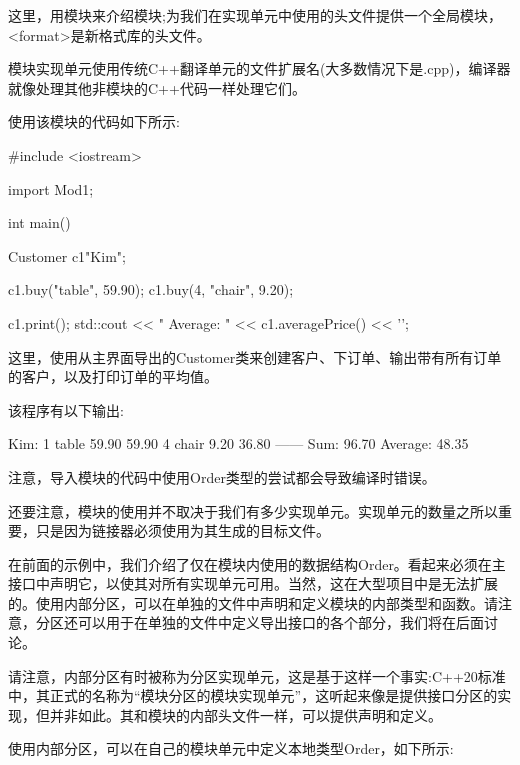 这里，用模块来介绍模块;为我们在实现单元中使用的头文件提供一个全局模块，<format>是新格式库的头文件。

模块实现单元使用传统C++翻译单元的文件扩展名(大多数情况下是.cpp)，编译器就像处理其他非模块的C++代码一样处理它们。


使用该模块的代码如下所示:


\begin{cpp}
#include <iostream>

import Mod1;

int main()
{
	Customer c1{"Kim"};
	
	c1.buy("table", 59.90);
	c1.buy(4, "chair", 9.20);
	
	c1.print();
	std::cout << " Average: " << c1.averagePrice() << '\n';
}
\end{cpp}

这里，使用从主界面导出的Customer类来创建客户、下订单、输出带有所有订单的客户，以及打印订单的平均值。

该程序有以下输出:

\begin{shell}
Kim:
  1 table        59.90   59.90
  4 chair         9.20   36.80
                        ------
    Sum:                 96.70
Average: 48.35
\end{shell}

注意，导入模块的代码中使用Order类型的尝试都会导致编译时错误。

还要注意，模块的使用并不取决于我们有多少实现单元。实现单元的数量之所以重要，只是因为链接器必须使用为其生成的目标文件。


在前面的示例中，我们介绍了仅在模块内使用的数据结构Order。看起来必须在主接口中声明它，以使其对所有实现单元可用。当然，这在大型项目中是无法扩展的。使用内部分区，可以在单独的文件中声明和定义模块的内部类型和函数。请注意，分区还可以用于在单独的文件中定义导出接口的各个部分，我们将在后面讨论。

请注意，内部分区有时被称为分区实现单元，这是基于这样一个事实:C++20标准中，其正式的名称为“模块分区的模块实现单元”，这听起来像是提供接口分区的实现，但并非如此。其和模块的内部头文件一样，可以提供声明和定义。


使用内部分区，可以在自己的模块单元中定义本地类型Order，如下所示:


